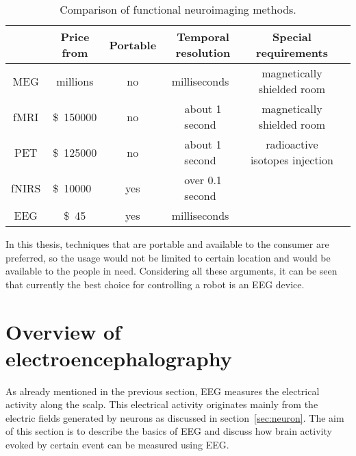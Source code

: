 
\newcommand{\pMEG}{\tablefootnote{http://neurogadget.com/2012/12/15/inexpensive-magnetoencephalography-meg-system-could-be-available-at-every-hospital/6495}}
\newcommand{\pfMRI}{\tablefootnote{http://info.blockimaging.com/bid/92623/MRI-Machine-Cost-and-Price-Guide}}
\newcommand{\pPET}{\tablefootnote{http://info.blockimaging.com/bid/68875/How-Much-Does-a-PET-CT-Scanner-Cost}}
\newcommand{\pEEG}{\tablefootnote{http://en.wikipedia.org/wiki/Comparison\_of\_consumer\_brain-computer\_interfaces}}
\newcommand{\pNIRS}{\cite{NIRS}}
\newcommand{\tresol}{\cite{timeresol}}


\begin{table}[h]
	\centering
	\begin{tabular}{|c|c|c|c|c|c|}\hline
			& Price	from				& Portable	& Temporal resolution		& Special requirements			\\\hline
\gls{MEG}	& millions\pMEG				& no		& milliseconds~\tresol		& magnetically shielded room	\\\hline
\gls{fMRI}	& \SI{150000}[\$]\pfMRI		& no		& about 1 second~\tresol	& magnetically shielded room	\\\hline
\gls{PET}	& \SI{125000}[\$]\pPET		& no		& about 1 second~\tresol	& radioactive isotopes injection\\\hline
\gls{fNIRS}	& \SI{10000}[\$]{}~\pNIRS	& yes		& over 0.1 second~\pNIRS	&								\\\hline
\gls{EEG}	& \SI{45}[\$]\pEEG			& yes		& milliseconds~\tresol		&								\\\hline
	\end{tabular}
	\caption{Comparison of functional neuroimaging methods.}
	\label{tab:neuroimaging}
\end{table}

In this thesis, techniques that are portable and available to the consumer are preferred, so the usage would not be limited to certain location and would be available to the people in need. Considering all these arguments, it can be seen that currently the best choice for controlling a robot is an \gls{EEG} device.

\section{Overview of electroencephalography}
\label{sec:EEG}

As already mentioned in the previous section, \gls{EEG} measures the electrical activity along the scalp. This electrical activity originates mainly from the electric fields generated by \glspl{neuron} as discussed in section~\ref{sec:neuron}. The aim of this section is to describe the basics of \gls{EEG} and discuss how brain activity evoked by certain event can be measured using \gls{EEG}.

